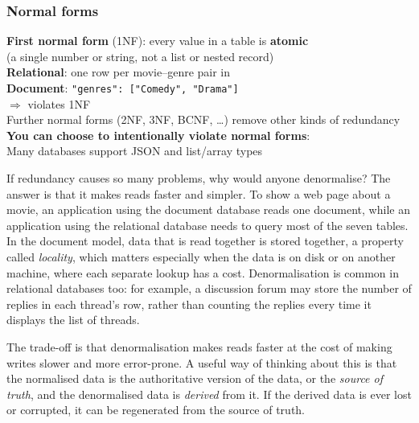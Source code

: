 \begin{frame}
    \label{s:normal-forms}
    \frametitle{Normal forms}
    \textbf{First normal form} (1NF): every value in a table is \textbf{atomic}\\
    (a single number or string, not a list or nested record)\\[1em]
    \textbf{Relational}: one row per movie--genre pair in \\[0.3em]
    \textbf{Document}: \texttt{"genres": ["Comedy", "Drama"]}\\
    \hspace*{1em}$\Rightarrow$ violates 1NF\\[1em]\pause
    Further normal forms (2NF, 3NF, BCNF, \dots)
    remove other kinds of redundancy\\[1em]\pause
    \textbf{You can choose to intentionally violate normal forms}:\\
    Many databases support JSON and list/array types
\end{frame}
\label{l:normal-forms}

If redundancy causes so many problems, why would anyone denormalise?
The answer is that it makes reads faster and simpler.
To show a web page about a movie, an application using the document database reads one document, while an application using the relational database needs to query most of the seven tables.
In the document model, data that is read together is stored together, a property called \emph{locality}, which matters especially when the data is on disk or on another machine, where each separate lookup has a cost.
Denormalisation is common in relational databases too: for example, a discussion forum may store the number of replies in each thread's row, rather than counting the replies every time it displays the list of threads.

The trade-off is that denormalisation makes reads faster at the cost of making writes slower and more error-prone.
A useful way of thinking about this is that the normalised data is the authoritative version of the data, or the \emph{source of truth}, and the denormalised data is \emph{derived} from it.
If the derived data is ever lost or corrupted, it can be regenerated from the source of truth.

